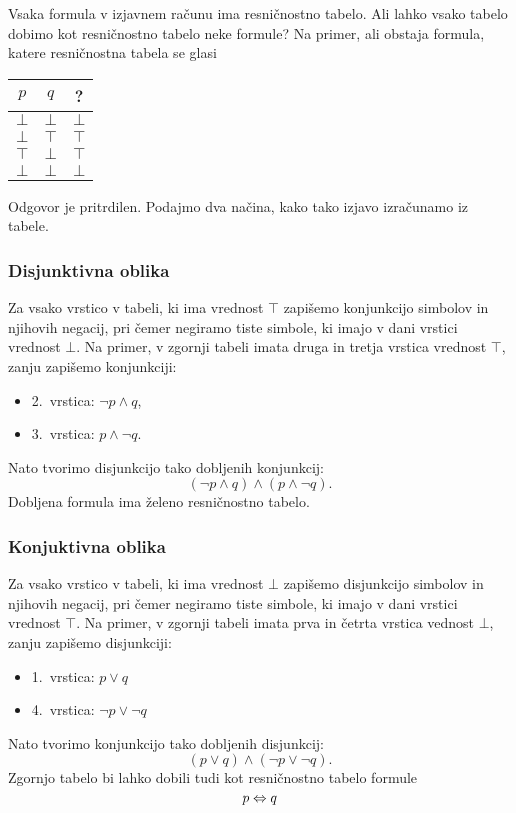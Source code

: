 Vsaka formula v izjavnem računu ima resničnostno tabelo. Ali lahko vsako tabelo
dobimo kot resničnostno tabelo neke formule? Na primer, ali obstaja formula,
katere resničnostna tabela se glasi
%
\begin{center}
  \begin{tabular}{ccc}
    \toprule
    $p$ & $q$ & ? \\ \midrule
    $\bot$ & $\bot$ & $\bot$ \\
    $\bot$ & $\top$ & $\top$ \\
    $\top$ & $\bot$ & $\top$ \\
    $\bot$ & $\bot$ & $\bot$ \\
    \bottomrule
  \end{tabular}
\end{center}
%
Odgovor je pritrdilen. Podajmo dva načina, kako tako izjavo izračunamo iz tabele.

\subsubsection{Disjunktivna oblika}
\label{sec:disjunktivna-oblika}

Za vsako vrstico v tabeli, ki ima vrednost $\top$ zapišemo konjunkcijo simbolov in
njihovih negacij, pri čemer negiramo tiste simbole, ki imajo v dani vrstici vrednost
$\bot$. Na primer, v zgornji tabeli imata druga in tretja vrstica vrednost $\top$, zanju
zapišemo konjunkciji:
%
\begin{itemize}
\item 2.~vrstica: $\neg p \land q$,
\item 3.~vrstica: $p \land \neg q$.
\end{itemize}
%
Nato tvorimo disjunkcijo tako dobljenih konjunkcij:
%
\begin{equation*}
  (\neg p \land q) \land (p \land \neg q).
\end{equation*}
%
Dobljena formula ima želeno resničnostno tabelo.

\subsubsection{Konjuktivna oblika}
\label{sec:konjuktivna-oblika}

Za vsako vrstico v tabeli, ki ima vrednost $\bot$ zapišemo
disjunkcijo simbolov in njihovih negacij, pri čemer negiramo tiste simbole, ki
imajo v dani vrstici vrednost $\top$. Na primer, v zgornji tabeli imata prva in
četrta vrstica vednost $\bot$, zanju zapišemo disjunkciji:
%
\begin{itemize}
\item 1.~vrstica: $p \lor q$
\item 4.~vrstica: $\neg p \lor \neg q$
\end{itemize}
%
Nato tvorimo konjunkcijo tako dobljenih disjunkcij:
%
\begin{equation*}
  (p \lor q) \land (\neg p \lor \neg q).
\end{equation*}
%
Zgornjo tabelo bi lahko dobili tudi kot resničnostno tabelo formule
%
\begin{equation*}
    p \Leftrightarrow q
\end{equation*}

